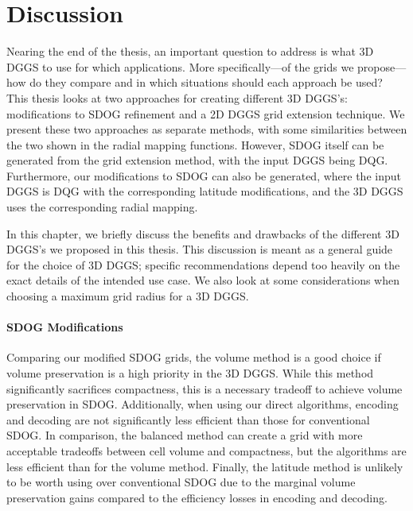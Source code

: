 \chapter{Discussion} \label{chap:discussion}
Nearing the end of the thesis, an important question to address is what 3D DGGS to use for which applications.
More specifically---of the grids we propose---how do they compare and in which situations should each approach be used?
This thesis looks at two approaches for creating different 3D DGGS's: modifications to SDOG refinement and a 2D DGGS grid extension technique.
We present these two approaches as separate methods, with some similarities between the two shown in the radial mapping functions.
However, SDOG itself can be generated from the grid extension method, with the input DGGS being DQG.
Furthermore, our modifications to SDOG can also be generated, where the input DGGS is DQG with the corresponding latitude modifications, and the 3D DGGS uses the corresponding radial mapping.


In this chapter, we briefly discuss the benefits and drawbacks of the different 3D DGGS's we proposed in this thesis.
This discussion is meant as a general guide for the choice of 3D DGGS; specific recommendations depend too heavily on the exact details of the intended use case.
We also look at some considerations when choosing a maximum grid radius for a 3D DGGS.


\subsubsection{SDOG Modifications}
Comparing our modified SDOG grids, the volume method is a good choice if volume preservation is a high priority in the 3D DGGS.
While this method significantly sacrifices compactness, this is a necessary tradeoff to achieve volume preservation in SDOG. Additionally, when using our direct algorithms, encoding and decoding are not significantly less efficient than those for conventional SDOG.
In comparison, the balanced method can create a grid with more acceptable tradeoffs between cell volume and compactness, but the algorithms are less efficient than for the volume method.
Finally, the latitude method is unlikely to be worth using over conventional SDOG due to the marginal volume preservation gains compared to the efficiency losses in encoding and decoding.


